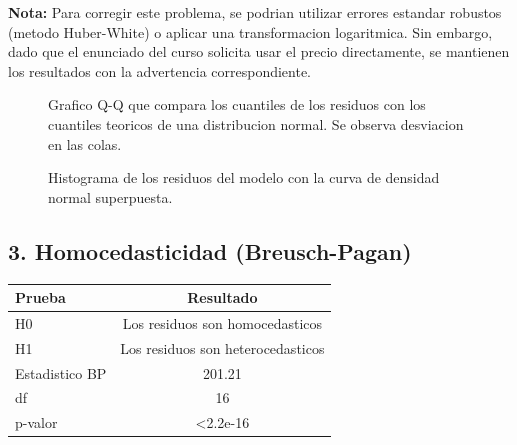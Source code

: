 \documentclass[12pt,a4paper]{article}
\begin{document}
\textbf{Nota:} Para corregir este problema, se podrian utilizar errores estandar robustos (metodo Huber-White) o aplicar una transformacion logaritmica. Sin embargo, dado que el enunciado del curso solicita usar el precio directamente, se mantienen los resultados con la advertencia correspondiente.

\begin{figure}[H]
    \centering
    \caption{Grafico Q-Q que compara los cuantiles de los residuos con los cuantiles teoricos de una distribucion normal. Se observa desviacion en las colas.}
    \label{fig:qqplot}
\end{figure}

\begin{figure}[H]
    \centering
    \caption{Histograma de los residuos del modelo con la curva de densidad normal superpuesta.}
    \label{fig:histograma}
\end{figure}

\subsection{3. Homocedasticidad (Breusch-Pagan)}

\begin{table}[H]
\centering
\begin{tabular}{lc}
\toprule
\textbf{Prueba} & \textbf{Resultado} \\
\midrule
H0 & Los residuos son homocedasticos \\
H1 & Los residuos son heterocedasticos \\
Estadistico BP & 201.21 \\
df & 16 \\
p-valor & \textless{}2.2e-16 \\
\bottomrule
\end{tabular}
\end{table}
\end{document}
